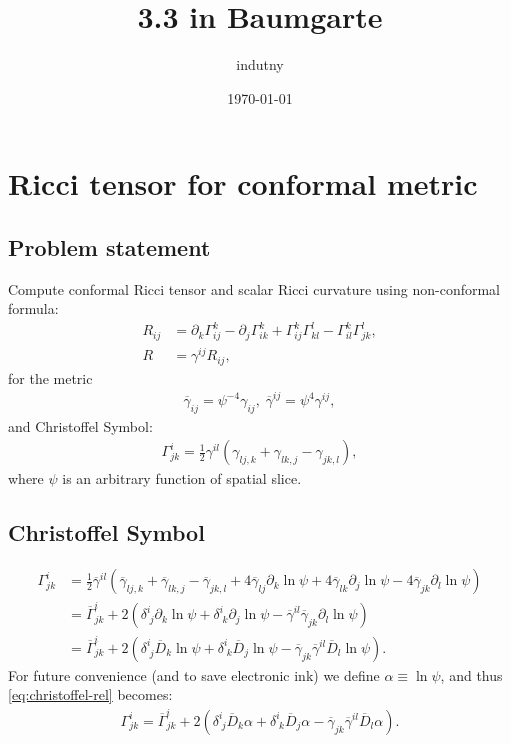 \documentclass[aps,prd,preprint]{revtex4-1}
\newcommand{\ogamma}{\overline{\gamma}}
\newcommand{\OGamma}{\overline{\Gamma}}
\newcommand{\OD}{\overline{D}}
\begin{document}
\title{3.3  in Baumgarte}
\author{indutny}
\date{\today}
\noaffiliation

\maketitle

\section{Ricci tensor for conformal metric}

\subsection{Problem statement}

Compute conformal Ricci tensor and scalar Ricci curvature using non-conformal formula:
\begin{align}\label{eq:ricci}
R_{ij} & = \partial_k \Gamma^k_{ij} - \partial_j \Gamma^k_{ik} + \Gamma^k_{ij} \Gamma^l_{kl} -
  \Gamma^k_{il} \Gamma^l_{jk},\\ 
R & = \gamma^{ij} R_{ij},
\end{align}
for the metric
\begin{align}
\ogamma_{ij} = \psi^{-4} \gamma_{ij}, \; \ogamma^{ij} = \psi^{4} \gamma^{ij},
\end{align}
and Christoffel Symbol:
\begin{align}\label{eq:cristoffel}
\Gamma^i_{jk} = \frac{1}{2} \gamma^{il} \left( \gamma_{lj,k} + \gamma_{lk,j} - \gamma_{jk,l} \right),
\end{align}
where $\psi$ is an arbitrary function of spatial slice.

\subsection{Christoffel Symbol}

\begin{align}
\Gamma^{i}_{jk} & = \frac{1}{2} \ogamma^{il} \left(
  \ogamma_{lj,k} +
  \ogamma_{lk,j} -
  \ogamma_{jk,l} +
  4 \ogamma_{lj} \partial_k \ln \psi +
  4 \ogamma_{lk} \partial_j \ln \psi -
  4 \ogamma_{jk} \partial_l \ln \psi \right) \\
& = \OGamma^{i}_{jk} + 2 \left(
  \delta^{i}_{\; j} \partial_k \ln \psi + \delta^{i}_{\; k} \partial_j \ln \psi - \ogamma^{il} \ogamma_{jk} \partial_l \ln \psi
  \right) \\
& = \OGamma^{i}_{jk} + 2 \left(
  \delta^i_{\; j} \OD_k \ln \psi + \delta^i_{\; k} \OD_j \ln \psi - \ogamma_{jk} \ogamma^{il}  \OD_l \ln \psi \right).
\label{eq:christoffel-rel}
\end{align}
For future convenience (and to save electronic ink) we define $\alpha \equiv \ln \psi$, and thus
\eqref{eq:christoffel-rel} becomes:
\begin{align}
\Gamma^{i}_{jk} = \OGamma^{i}_{jk} + 2 \left(
  \delta^i_{\; j} \OD_k \alpha + \delta^i_{\; k} \OD_j \alpha - \ogamma_{jk} \ogamma^{il}  \OD_l \alpha \right).
\end{align}
\end{document}
